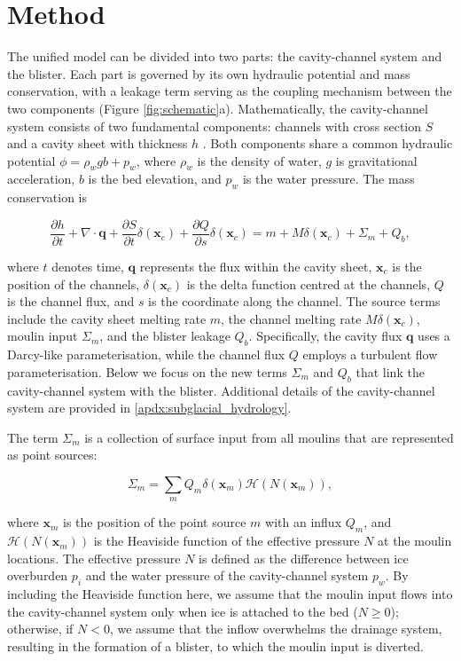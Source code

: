 \documentclass[draft]{agujournal2019}
\newcommand{\pdiff}[2]{\frac{\partial{#1}}{\partial{#2}}}
\newcommand{\figref}[1]{Figure \ref{#1}}
\newcommand{\appref}[1]{\ref{#1}}
\begin{document}
\section{Method}\label{sec:method}
The unified model can be divided into two parts: the cavity-channel system and the blister. Each part is governed by its own hydraulic potential and mass conservation, with a leakage term serving as the coupling mechanism between the two components (\figref{fig:schematic}a). Mathematically, the cavity-channel system consists of two fundamental components: channels with cross section $S$ and a cavity sheet with thickness $h$ \cite{hewitt2013Seasonal,werder2013Modeling}. Both components share a common hydraulic potential $\phi=\rho_w g b+p_w$, where $\rho_w$ is the density of water, $g$ is gravitational acceleration, $b$ is the bed elevation, and $p_w$ is the water pressure. The mass conservation is
\begin{linenomath*}
\begin{equation}\label{eq:mass_conservation}
    \pdiff{h}{t} + \nabla \cdot \boldsymbol{q} + \pdiff{S}{t} \delta(\boldsymbol{x}_c) +\pdiff{Q}{s} \delta(\boldsymbol{x}_c) = m + M \delta(\boldsymbol{x}_c) + \Sigma_m + Q_b,
\end{equation}
\end{linenomath*}
where $t$ denotes time, $\boldsymbol{q}$ represents the flux within the cavity sheet, $\boldsymbol{x}_c$ is the position of the channels, $\delta(\boldsymbol{x}_c)$ is the delta function centred at the channels, $Q$ is the channel flux, and $s$ is the coordinate along the channel. The source terms include the cavity sheet melting rate $m$, the channel melting rate $M\delta(\boldsymbol{x}_c)$, moulin input $\Sigma_m$, and the blister leakage $Q_b$. Specifically, the cavity flux $\boldsymbol{q}$ uses a Darcy-like parameterisation, while the channel flux $Q$ employs a turbulent flow parameterisation. Below we focus on the new terms $\Sigma_m$ and $Q_b$ that link the cavity-channel system with the blister. Additional details of the cavity-channel system are provided in \appref{apdx:subglacial_hydrology}.

The term $\Sigma_m$ is a collection of surface input from all moulins that are represented as point sources:
\begin{linenomath*}
\begin{equation}
    \Sigma_m = \sum_{m}Q_m\delta\left(\boldsymbol{x}_m\right)\mathcal{H}\left(N(\boldsymbol{x}_m)\right),
\end{equation}
\end{linenomath*}
where $\boldsymbol{x}_m$ is the position of the point source $m$ with an influx $Q_m$, and $\mathcal{H}\left(N(\boldsymbol{x}_m)\right)$ is the Heaviside function of the effective pressure $N$ at the moulin locations. The effective pressure $N$ is defined as the difference between ice overburden $p_i$ and the water pressure of the cavity-channel system $p_w$. By including the Heaviside function here, we assume that the moulin input flows into the cavity-channel system only when ice is attached to the bed ($N\ge0$); otherwise, if $N<0$, we assume that the inflow overwhelms the drainage system, resulting in the formation of a blister, to which the moulin input is diverted.
\end{document}
